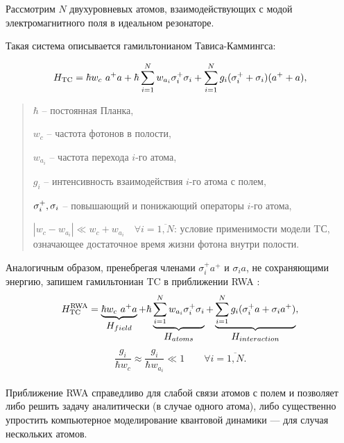Рассмотрим $N$ двухуровневых атомов, взаимодействующих с модой электромагнитного поля в идеальном резонаторе. 

Такая система описывается гамильтонианом Тависа-Каммингса:
\begin{normalsize}
	\begin{equation}
		H_{\text{TC}} =  \hbar w_{c}\ a^{+}a + \hbar \sum_{i=1}^N{w_{a_{i}}\sigma_{i}^{+}\sigma_{i}} + \sum_{i=1}^N{g_{i}(\sigma_{i}^{+}+\sigma_{i})(a^{+}+a)},
	\end{equation}
\end{normalsize}

\begin{quote}
	$\hbar $ -- постоянная Планка,
	
	$w_{c}$ -- частота фотонов в полости,
	
	$w_{a_{i}}$ -- частота перехода $i$-го атома,
	
	$g_{i}$ -- интенсивность взаимодействия $i$-го атома с полем,
	
	$\sigma_{i}^{+}, \sigma_{i}$ -- повышающий и понижающий операторы $i$-го атома,
	
	$|w_{c}-w_{a_{i}}|\ll w_{c}+w_{a_{i}} \quad\forall i = \overline{1,N}$: условие применимости модели TС, означающее достаточное время жизни фотона внутри полости.
\end{quote}

\indent Аналогичным образом, пренебрегая членами $\displaystyle{\sigma_{i}^{+}a^{+}}$ и $\displaystyle{\sigma_{i} a}$, не сохраняющими энергию, запишем гамильтониан TC в приближении RWA \cite{ozhigov_qq,rwa_1,rwa_2}:
\begin{equation}
	H_{\text{TC}}^{\text{RWA}} = \underbrace{\hbar w_{c}\ a^{+}a}_{\textstyle H_{field}} + \hbar\underbrace{\sum_{i=1}^N{w_{a_{i}}\sigma_{i}^+\sigma_{i}}}_{\textstyle H_{atoms}} + \underbrace{\sum_{i=1}^N{g_{i}(\sigma_{i}^{+}a+\sigma_{i}a^{+})}}_{\textstyle H_{interaction}},
\end{equation}
\begin{equation}
	\frac{g_{i}}{\hbar w_{c}}\approx\frac{g_{i}}{\hbar w_{a_{i}}}\ll1 \qquad \forall i = \overline{1,N}.
\end{equation}
\vspace{-1em}
\
\\[0pt]
\indent Приближение RWA \cite{ozhigov_qq,rwa_1,rwa_2} справедливо для слабой связи атомов с полем и позволяет либо решить задачу аналитически (в случае одного атома), либо существенно упростить компьютерное моделирование квантовой динамики --- для случая нескольких атомов. 

